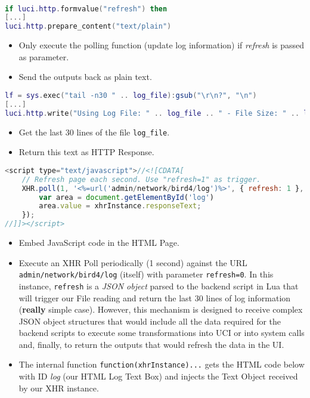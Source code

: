 \\
\begin{lstlisting}[language=lua,caption={Lua - Log Code (I)}]
if luci.http.formvalue("refresh") then
[...]
luci.http.prepare_content("text/plain")
\end{lstlisting}
\begin{itemize}
    \item Only execute the polling function (update log information) if \textit{refresh} is passed as parameter.
    \item Send the outputs back as plain text.
\end{itemize}

\begin{lstlisting}[language=lua,caption={Lua - Log Code (II)}]
lf = sys.exec("tail -n30 " .. log_file):gsub("\r\n?", "\n")
[...]
luci.http.write("Using Log File: " .. log_file .. " - File Size: " .. log_size .. "\n" .. lf)
\end{lstlisting}
\begin{itemize}
    \item Get the last 30 lines of the file \texttt{log\_file}.
    \item Return this text as HTTP Response.
\end{itemize}

\begin{lstlisting}[language=javascript,caption={JavaScript - Log Code (III)}]
<script type="text/javascript">//<![CDATA[
    // Refresh page each second. Use "refresh=1" as trigger.
    XHR.poll(1, '<%=url('admin/network/bird4/log')%>', { refresh: 1 },       function(xhrInstance) {
        var area = document.getElementById('log')
        area.value = xhrInstance.responseText;
    });
//]]></script>
\end{lstlisting}
\begin{itemize}
    \item Embed JavaScript code in the HTML Page.
    \item Execute an XHR Poll periodically (1 second) against the URL \texttt{admin/network/bird4/log} (itself) with parameter \texttt{refresh=0}.
    In this instance, \texttt{refresh} is a \textit{JSON object} parsed to the backend script in Lua that will trigger our File reading and return the last 30 lines of log information (\textbf{really} simple case).
    However, this mechanism is designed to receive complex JSON object structures that would include all the data required for the backend scripts to execute some transformations into UCI or into system calls and, finally, to return the outputs that would refresh the data in the UI.
    \item The internal function \texttt{function(xhrInstance)...} gets the HTML code below with ID \textit{log} (our HTML Log Text Box) and injects the Text Object received by our XHR instance.
\end{itemize}

